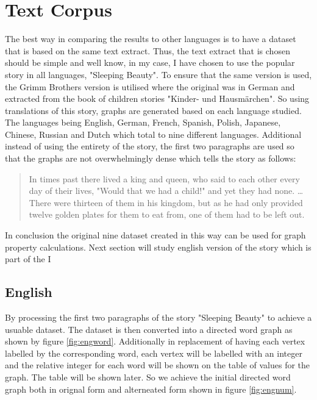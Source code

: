 \section{Text Corpus}
The best way in comparing the results to other languages is to have a dataset that is based on the same text extract. Thus, the text extract that is chosen should be simple and well know, in my case, I have chosen to use the popular story in all languages, "Sleeping Beauty". To ensure that the same version is used, the Grimm Brothers version is utilised where the original was in German and extracted from the book of children stories "Kinder- und Hausmärchen"\cite{grimm1857kinder}. So using translations of this story, graphs are generated based on each language studied. The languages being English, German, French, Spanish, Polish, Japanese, Chinese, Russian and Dutch which total to nine different languages. Additional instead of using the entirety of the story, the first two paragraphs are used so that the graphs are not overwhelmingly dense which tells the story as follows:
\begin{quote}
In times past there lived a king and queen, who said to each other every day of their lives, "Would that we had a child!" and yet they had none. \dots There were thirteen of them in his kingdom, but as he had only provided twelve golden plates for them to eat from, one of them had to be left out.
\end{quote}
In conclusion the original nine dataset created in this way can be used for graph property calculations. Next section will study english version of the story which is part of the I

\subsection{English}
By processing the first two paragraphs of the story "Sleeping Beauty" to achieve a usuable dataset. The dataset is then converted into a directed word graph as shown by figure \ref{fig:engword}. Additionally in replacement of having each vertex labelled by the corresponding word, each vertex will be labelled with an integer and the relative integer for each word will be shown on the table of values for the graph. The table will be shown later. So we achieve the initial directed word graph both in orignal form and alterneated form shown in figure \ref{fig:engnum}.

